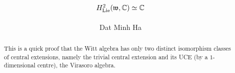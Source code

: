 

\setcounter{section}{0}





    \title{\texorpdfstring{$H^2_{\mathrm{Lie}}(\mathfrak{w}, \mathbb{C}) \simeq \mathbb{C}$}{}}
    
    \author{Dat Minh Ha}
    \maketitle
    
    \begin{abstract}
        This is a quick proof that the Witt algebra has only two distinct isomorphism classes of central extensions, namely the trivial central extension and its UCE (by a $1$-dimensional centre), the Virasoro algebra.
    \end{abstract}
    
    {
    \hypersetup{} 
    }

